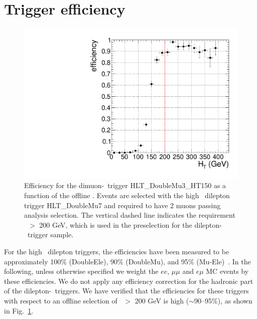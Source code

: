 \section{Trigger efficiency}
\label{sec:trgEff}


\begin{figure}[tbh]
\begin{center}
\includegraphics[width=0.6\linewidth]{plots/mmht.pdf}
\caption{\label{fig:httrig}\protect 
Efficiency for the dimuon-\Ht\ trigger HLT\_DoubleMu3\_HT150 
as a function of the offline \Ht. Events are selected with the high \pt\ dilepton trigger 
HLT\_DoubleMu7 and required to have 2 muons passing analysis selection.
The vertical dashed line indicates the requirement \Ht\ $>$ 200 GeV, which is used in the
preselection for the dilepton-\Ht\ trigger sample.
}
\end{center}
\end{figure}

For the high \pt\ dilepton triggers, the efficiencies have been measured to be approximately
100\% (DoubleEle), 90\% (DoubleMu), and 95\% (Mu-Ele)~\cite{ref:HWW}. 
In the following, unless otherwise specified we weight the $ee$, $\mu\mu$ and $e\mu$ MC events 
by these efficiencies. We do not apply any efficiency correction for the hadronic 
part of the dilepton-\Ht\ triggers. We have verified that the efficiencies for these triggers
with respect to an offline selection of \Ht\ $>$ 200 GeV is high ($\sim$90--95\%), 
as shown in Fig.~\ref{fig:httrig}.



